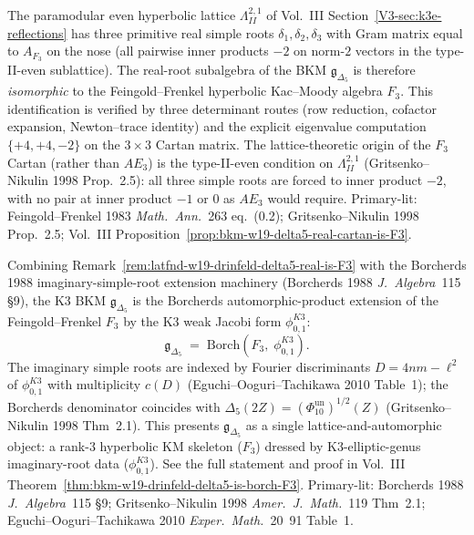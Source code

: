 \begin{remark}
\label{rem:latfnd-w19-drinfeld-delta5-real-is-F3}
The paramodular even hyperbolic lattice $\Lambda^{2,1}_{II}$
of Vol.~III Section~\ref{V3-sec:k3e-reflections} has three primitive
real simple roots $\delta_1, \delta_2, \delta_3$ with Gram matrix
equal to $A_{F_3}$ on the nose (all pairwise inner products $-2$ on
norm-$2$ vectors in the type-II-even sublattice). The real-root
subalgebra of the BKM $\mathfrak{g}_{\Delta_5}$ is therefore
\emph{isomorphic} to the Feingold--Frenkel hyperbolic Kac--Moody
algebra $F_3$. This identification is verified by
three determinant routes (row reduction, cofactor
expansion, Newton--trace identity) and the explicit eigenvalue
computation $\{+4, +4, -2\}$ on the $3\times 3$ Cartan matrix. The
lattice-theoretic origin of the $F_3$ Cartan (rather than
$AE_3$) is the type-II-even condition on $\Lambda^{2,1}_{II}$
(Gritsenko--Nikulin 1998 Prop.~2.5): all three simple roots are
forced to inner product $-2$, with no pair at inner product $-1$ or
$0$ as $AE_3$ would require.
Primary-lit: Feingold--Frenkel 1983 \emph{Math.\ Ann.}~263 eq.~(0.2);
Gritsenko--Nikulin 1998 Prop.~2.5;
Vol.~III Proposition~\ref{prop:bkm-w19-delta5-real-cartan-is-F3}.
\end{remark}

\begin{remark}[$\mathfrak{g}_{\Delta_5} =
\mathrm{Borch}(F_3, \phi_{0,1}^{K3})$]
\label{rem:latfnd-w19-drinfeld-delta5-borch-F3}
Combining
Remark~\ref{rem:latfnd-w19-drinfeld-delta5-real-is-F3} with the
Borcherds 1988 imaginary-simple-root extension machinery
(Borcherds 1988 \emph{J.\ Algebra}~115 \S9), the K3 BKM
$\mathfrak{g}_{\Delta_5}$ is the Borcherds automorphic-product
extension of the Feingold--Frenkel $F_3$ by the K3 weak Jacobi form
$\phi_{0,1}^{K3}$:
\[
 \mathfrak{g}_{\Delta_5}
 \;=\;\mathrm{Borch}\!\left(F_3,\;\phi_{0,1}^{K3}\right).
\]
The imaginary simple roots are indexed by Fourier discriminants
$D = 4nm - \ell^2$ of $\phi_{0,1}^{K3}$ with multiplicity $c(D)$
(Eguchi--Ooguri--Tachikawa 2010 Table~1); the Borcherds denominator
coincides with $\Delta_5(2Z) = (\Phi_{10}^{\mathrm{un}})^{1/2}(Z)$ (Gritsenko--Nikulin
1998 Thm~2.1). This presents $\mathfrak{g}_{\Delta_5}$ as a single
lattice-and-automorphic object: a rank-$3$ hyperbolic KM skeleton
($F_3$) dressed by K3-elliptic-genus imaginary-root data
($\phi_{0,1}^{K3}$). See the full statement and proof in
Vol.~III Theorem~\ref{thm:bkm-w19-drinfeld-delta5-is-borch-F3}.
Primary-lit: Borcherds 1988 \emph{J.\ Algebra}~115 \S9;
Gritsenko--Nikulin 1998 \emph{Amer.\ J.\ Math.}~119 Thm~2.1;
Eguchi--Ooguri--Tachikawa 2010 \emph{Exper.\ Math.}~20~91 Table~1.
\end{remark}

